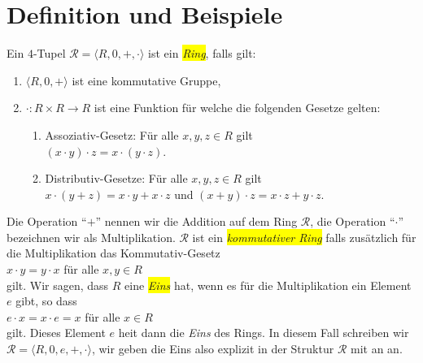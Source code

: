\section{Definition und Beispiele}
\begin{Definition}[Ring]
Ein $4$-Tupel $\mathcal{R} = \langle R, 0, +, \cdot \rangle$ ist ein \emph{\colorbox{yellow}{Ring}}, falls gilt:
\begin{enumerate}
\item $\langle R, 0, + \rangle$ ist eine kommutative Gruppe,
\item $\cdot: R \times R \rightarrow R$ ist eine Funktion f\"{u}r welche die folgenden Gesetze gelten:
      \begin{enumerate}
      \item Assoziativ-Gesetz:  F\"{u}r alle $x, y,z \in R$ gilt
            \\[0.2cm]
            \hspace*{1.3cm}
            $(x \cdot y) \cdot z = x \cdot (y \cdot z)$.
      \item Distributiv-Gesetze: F\"{u}r alle $x, y,z \in R$ gilt
            \\[0.2cm]
            \hspace*{1.3cm} 
            $x \cdot (y + z) = x \cdot y + x \cdot z$ \quad und \quad
            $(x + y) \cdot z = x \cdot z + y \cdot z$.
      \end{enumerate}
\end{enumerate}
Die Operation ``$+$'' nennen wir die Addition auf dem Ring $\mathcal{R}$, die Operation ``$\cdot$'' bezeichnen 
wir als Multiplikation.
$\mathcal{R}$ ist ein \colorbox{yellow}{\emph{kommutativer Ring}} falls zus\"{a}tzlich f\"{u}r die Multiplikation
das Kommutativ-Gesetz
\\[0.2cm]
\hspace*{1.3cm}
$x \cdot y = y \cdot x$ \quad f\"{u}r alle $x,y \in R$
\\[0.2cm]
gilt.  Wir sagen, dass $R$ eine \colorbox{yellow}{\emph{Eins}} hat, wenn es f\"{u}r die Multiplikation ein Element $e$ gibt, so dass
\\[0.2cm]
\hspace*{1.3cm}
$e \cdot x = x \cdot e = x$ \quad f\"{u}r alle $x \in R$
\\[0.2cm]
gilt.  Dieses Element $e$ hei\3t dann die \emph{Eins} des Rings.  In diesem Fall schreiben wir
$\mathcal{R} = \langle R, 0, e, +, \cdot \rangle$, wir geben die Eins also explizit in der Struktur $\mathcal{R}$ mit an
an.
\eox
\end{Definition}

